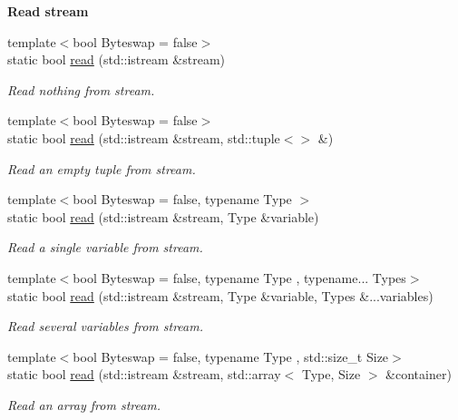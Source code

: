 \begin{Indent}{\bf Read stream}\par
\begin{DoxyCompactItemize}
\item 
{\footnotesize template$<$bool Byteswap = false$>$ }\\static bool \hyperlink{exceptionmagrathea_1_1DataHandler_ae34eaeb6faf631309cb9000316771377}{read} (std\-::istream \&stream)
\begin{DoxyCompactList}\small\item\em Read nothing from stream. \end{DoxyCompactList}\item 
{\footnotesize template$<$bool Byteswap = false$>$ }\\static bool \hyperlink{exceptionmagrathea_1_1DataHandler_a3b2d2a3c03f6fae7ce3fc7c54e3808aa}{read} (std\-::istream \&stream, std\-::tuple$<$$>$ \&)
\begin{DoxyCompactList}\small\item\em Read an empty tuple from stream. \end{DoxyCompactList}\item 
{\footnotesize template$<$bool Byteswap = false, typename Type $>$ }\\static bool \hyperlink{exceptionmagrathea_1_1DataHandler_a8a9ffe306dfa1cbc4dfc27d0bab1385f}{read} (std\-::istream \&stream, Type \&variable)
\begin{DoxyCompactList}\small\item\em Read a single variable from stream. \end{DoxyCompactList}\item 
{\footnotesize template$<$bool Byteswap = false, typename Type , typename... Types$>$ }\\static bool \hyperlink{exceptionmagrathea_1_1DataHandler_a67649218acd759dde8b1d9617a36219f}{read} (std\-::istream \&stream, Type \&variable, Types \&...variables)
\begin{DoxyCompactList}\small\item\em Read several variables from stream. \end{DoxyCompactList}\item 
{\footnotesize template$<$bool Byteswap = false, typename Type , std\-::size\-\_\-t Size$>$ }\\static bool \hyperlink{exceptionmagrathea_1_1DataHandler_a2bf9d85128f5bccff6f9d764120cd49f}{read} (std\-::istream \&stream, std\-::array$<$ Type, Size $>$ \&container)
\begin{DoxyCompactList}\small\item\em Read an array from stream. \end{DoxyCompactList}\item 
$$
\end{DoxyCompactItemize}
\end{Indent}

